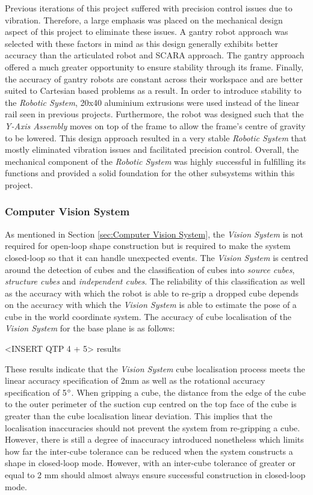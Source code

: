 Previous iterations of this project suffered with precision control issues due to vibration. Therefore, a large emphasis was placed on the mechanical design aspect of this project to eliminate these issues. A gantry robot approach was selected with these factors in mind as this design generally exhibits better accuracy than the articulated robot and SCARA approach. The gantry approach offered a much greater opportunity to ensure stability through its frame. Finally, the accuracy of gantry robots are constant across their workspace and are better suited to Cartesian based problems as a result. In order to introduce stability to the \textit{Robotic System}, 20x40 aluminium extrusions were used instead of the linear rail seen in previous projects. Furthermore, the robot was designed such that the \textit{Y-Axis Assembly} moves on top of the frame to allow the frame's centre of gravity to be lowered. This design approach resulted in a very stable \textit{Robotic System} that mostly eliminated vibration issues and facilitated precision control. Overall, the mechanical component of the \textit{Robotic System} was highly successful in fulfilling its functions and provided a solid foundation for the other subsystems within this project.

\subsubsection{Computer Vision System} \label{sec5:Computer Vision System}

As mentioned in Section \ref{sec:Computer Vision System}, the \textit{Vision System} is not required for open-loop shape construction but is required to make the system closed-loop so that it can handle unexpected events. The \textit{Vision System} is centred around the detection of cubes and the classification of cubes into \textit{source cubes}, \textit{structure cubes} and \textit{independent cubes}. The reliability of this classification as well as the accuracy with which the robot is able to re-grip a dropped cube depends on the accuracy with which the \textit{Vision System} is able to estimate the pose of a cube in the world coordinate system. The accuracy of cube localisation of the \textit{Vision System} for the base plane is as follows:

<INSERT QTP 4 + 5> results

These results indicate that the \textit{Vision System} cube localisation process meets the linear accuracy specification of 2mm as well as the rotational accuracy specification of 5$^{\circ}$. When gripping a cube, the distance from the edge of the cube to the outer perimeter of the suction cup centred on the top face of the cube is greater than the cube localisation linear deviation. This implies that the localisation inaccuracies should not prevent the system from re-gripping a cube. However, there is still a degree of inaccuracy introduced nonetheless which limits how far the inter-cube tolerance can be reduced when the system constructs a shape in closed-loop mode. However, with an inter-cube tolerance of greater or equal to 2 mm should almost always ensure successful construction in closed-loop mode.

